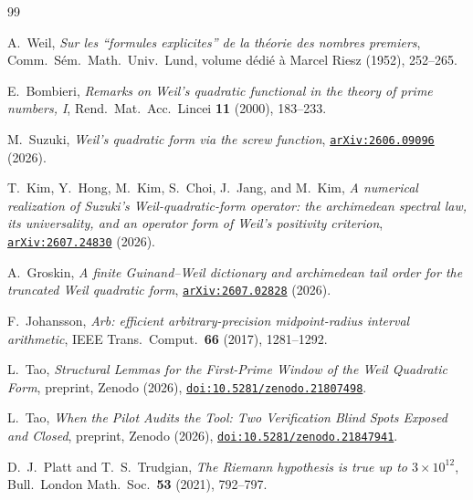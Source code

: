 \documentclass[12pt,a4paper]{amsart}
\theoremstyle{plain}
\theoremstyle{definition}
\newcommand{\doi}[1]{\href{https://doi.org/#1}{\texttt{doi:#1}}}
\newcommand{\arxiv}[1]{\href{https://arxiv.org/abs/#1}{\texttt{arXiv:#1}}}
\begin{document}
\begin{thebibliography}{99}

A.~Weil,
\emph{Sur les ``formules explicites'' de la th\'eorie des nombres premiers},
Comm.\ S\'em.\ Math.\ Univ.\ Lund, volume d\'edi\'e \`a Marcel Riesz (1952),
252--265.

E.~Bombieri,
\emph{Remarks on {W}eil's quadratic functional in the theory of prime numbers,
{I}},
Rend.\ Mat.\ Acc.\ Lincei \textbf{11} (2000), 183--233.

M.~Suzuki,
\emph{Weil's quadratic form via the screw function},
\arxiv{2606.09096} (2026).

T.~Kim, Y.~Hong, M.~Kim, S.~Choi, J.~Jang, and M.~Kim,
\emph{A numerical realization of {S}uzuki's {W}eil-quadratic-form operator:
the archimedean spectral law, its universality, and an operator form of
{W}eil's positivity criterion},
\arxiv{2607.24830} (2026).

A.~Groskin,
\emph{A finite {G}uinand--{W}eil dictionary and archimedean tail order for the
truncated {W}eil quadratic form},
\arxiv{2607.02828} (2026).

F.~Johansson,
\emph{Arb: efficient arbitrary-precision midpoint-radius interval arithmetic},
IEEE Trans.\ Comput.\ \textbf{66} (2017), 1281--1292.

L.~Tao,
\emph{Structural Lemmas for the First-Prime Window of the {W}eil Quadratic
Form},
preprint, Zenodo (2026),
\doi{10.5281/zenodo.21807498}.

L.~Tao,
\emph{When the Pilot Audits the Tool: Two Verification Blind Spots Exposed and
Closed},
preprint, Zenodo (2026),
\doi{10.5281/zenodo.21847941}.

D.~J.~Platt and T.~S.~Trudgian,
\emph{The {R}iemann hypothesis is true up to $3\times 10^{12}$},
Bull.\ London Math.\ Soc.\ \textbf{53} (2021), 792--797.

\end{thebibliography}
\end{document}
